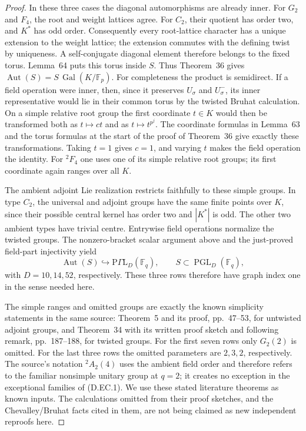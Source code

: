 \begin{proof}
In these three cases the diagonal automorphisms are
already inner. For $G_2$ and $F_4$, the root and weight
lattices agree. For $C_2$, their quotient has order two,
and $K^*$ has odd order. Consequently every root-lattice
character has a unique extension to the weight lattice;
the extension commutes with the defining twist by
uniqueness. A self-conjugate diagonal element therefore
belongs to the fixed torus. Lemma~64 puts this torus
inside $S$. Thus Theorem~36 gives
$\operatorname{Aut}(S)=S\,\operatorname{Gal}(K/\mathbb F_p)$.
For completeness the product is semidirect. If a field
operation were inner, then, since it preserves $U_\sigma$
and $U^-_\sigma$, its inner representative would lie in
their common torus by the twisted Bruhat calculation.
On a simple relative root group the first coordinate
$t\in K$ would then be transformed both as $t\mapsto
c t$ and as $t\mapsto t^{p^j}$. The coordinate formulas
in Lemma~63 and the torus formulas at the start of the
proof of Theorem~36 give exactly these transformations.
Taking $t=1$ gives $c=1$, and varying $t$ makes the
field operation the identity. For ${}^2F_4$ one uses
one of its simple relative root groups; its first
coordinate again ranges over all $K$.

The ambient adjoint Lie realization restricts faithfully
to these simple groups. In type $C_2$, the universal
and adjoint groups have the same finite points over
$K$, since their possible central kernel has order two
and $|K^*|$ is odd. The other two ambient types have
trivial centre. Entrywise field operations normalize
the twisted groups. The nonzero-bracket scalar argument
above and the just-proved field-part injectivity yield
\[
 \operatorname{Aut}(S)\hookrightarrow
              \mathrm{P}\Gamma\mathrm{L}_{D}(\mathbb F_q),
 \qquad S\subset\operatorname{PGL}_{D}(\mathbb F_q),
                                                        \tag{D.EC.6}
\]
with $D=10,14,52$, respectively. These three rows therefore
have graph index one in the sense needed here.

The simple ranges and omitted groups are exactly the
known simplicity statements in the same source:
Theorem~5 and its proof, pp.~47--53, for untwisted
adjoint groups, and Theorem~34 with its written proof
sketch and following remark, pp.~187--188, for twisted
groups. For the first seven rows only $G_2(2)$ is
omitted. For the last three rows the omitted parameters
are $2,3,2$, respectively. The source's notation
${}^2A_2(4)$ uses the ambient field order and therefore
refers to the familiar nonsimple unitary group at
$q=2$; it creates no exception in the exceptional
families of (D.EC.1). We use these stated literature
theorems as known inputs. The calculations omitted
from their proof sketches, and the Chevalley/Bruhat
facts cited in them, are not being claimed as new
independent reproofs here.


\end{proof}

